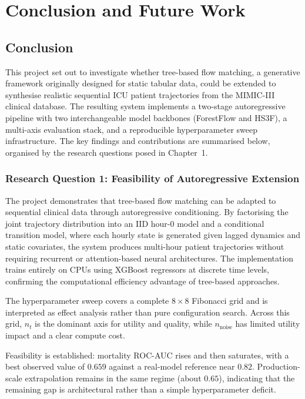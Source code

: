 \chapter{Conclusion and Future Work}

\section{Conclusion}

This project set out to investigate whether tree-based flow matching, a generative framework originally designed for static tabular data, could be extended to synthesise realistic sequential ICU patient trajectories from the MIMIC-III clinical database. The resulting system implements a two-stage autoregressive pipeline with two interchangeable model backbones (ForestFlow and HS3F), a multi-axis evaluation stack, and a reproducible hyperparameter sweep infrastructure. The key findings and contributions are summarised below, organised by the research questions posed in Chapter~1.

\subsection{Research Question 1: Feasibility of Autoregressive Extension}

The project demonstrates that tree-based flow matching can be adapted to sequential clinical data through autoregressive conditioning. By factorising the joint trajectory distribution into an IID hour-0 model and a conditional transition model, where each hourly state is generated given lagged dynamics and static covariates, the system produces multi-hour patient trajectories without requiring recurrent or attention-based neural architectures. The implementation trains entirely on CPUs using XGBoost regressors at discrete time levels, confirming the computational efficiency advantage of tree-based approaches.

The hyperparameter sweep covers a complete $8 \times 8$ Fibonacci grid and is interpreted as effect analysis rather than pure configuration search. Across this grid, $n_t$ is the dominant axis for utility and quality, while $n_{\text{noise}}$ has limited utility impact and a clear compute cost.

Feasibility is established: mortality ROC-AUC rises and then saturates, with a best observed value of $0.659$ against a real-model reference near $0.82$. Production-scale extrapolation remains in the same regime (about $0.65$), indicating that the remaining gap is architectural rather than a simple hyperparameter deficit.

